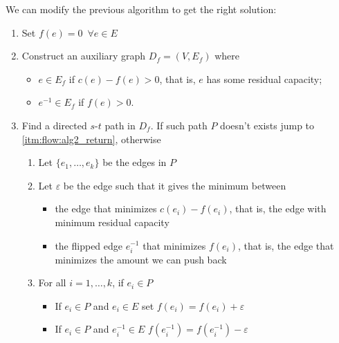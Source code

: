 \documentclass[12pt]{extarticle}
\begin{document}
We can modify the previous algorithm to get the right solution:

\begin{enumerate}
    \item Set $f(e) = 0 \enspace \forall e \in E$
    \item \label{itm:flow:alg2_iter} Construct an auxiliary graph $D_f = (V, E_f)$ where
          \begin{itemize}
              \item $e \in E_f$ if $c(e) - f(e) > 0$, that is, $e$ has some residual capacity;
              \item $e^{-1} \in E_f$ if $f(e) > 0$.
          \end{itemize}
    \item Find a directed $s$-$t$ path in $D_f$. If such path $P$ doesn't exists jump to \autoref{itm:flow:alg2_return}, otherwise
          \begin{enumerate}[label*=\arabic*.]
              \item Let $\{e_1, \ldots, e_k\}$ be the edges in $P$
              \item Let $\varepsilon$ be the edge such that it gives the minimum between
                    \begin{itemize}
                        \item the edge that minimizes $c(e_i) - f(e_i)$, that is, the edge with minimum residual capacity
                        \item the flipped edge $e^{-1}_i$ that minimizes $f(e_i)$, that is, the edge that minimizes the amount we can push back
                    \end{itemize}
              \item For all $i = 1, \ldots, k$, if $e_i \in P$
                    \begin{itemize}
                        \item If $e_i \in P$ and $e_i \in E$ set $f(e_i) = f(e_i) + \varepsilon$
                        \item If $e_i \in P$ and $e_i^{-1} \in E$ $f(e_i^{-1}) = f(e_i^{-1}) - \varepsilon$
                    \end{itemize}

\end{enumerate}
\end{enumerate}
\end{document}
